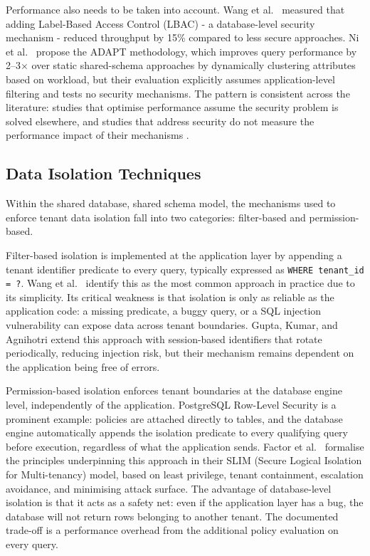 Performance also needs to be taken into account. Wang et al.\ \cite{wangStudyPerformanceEvaluation2008}
measured that adding Label-Based Access Control (LBAC) - a database-level
security mechanism - reduced throughput by 15\% compared to less secure approaches.
Ni et al.\ \cite{niAdaptiveDatabaseSchema2014} propose the ADAPT methodology, which improves query performance by 2--3$\times$ over static shared-schema approaches by dynamically
clustering attributes based on workload, but their evaluation explicitly assumes
application-level filtering and tests no security mechanisms. The pattern is
consistent across the literature: studies that optimise performance assume the
security problem is solved elsewhere, and studies that address security do not
measure the performance impact of their mechanisms \cite{karatasMultitenantArchitecturesCloud2017, battulaSystematicReviewMultitenant2024}.

\subsection*{Data Isolation Techniques}
Within the shared database, shared schema model, the mechanisms used to enforce
tenant data isolation fall into two categories: filter-based and
permission-based.

Filter-based isolation is implemented at the application layer by appending a
tenant identifier predicate to every query, typically expressed as
\texttt{WHERE tenant\_id = ?}. Wang et al.\ \cite{wangStudyPerformanceEvaluation2008} identify this as the
most common approach in practice due to its simplicity. Its critical weakness is
that isolation is only as reliable as the application code: a missing predicate,
a buggy query, or a SQL injection vulnerability can expose data across tenant
boundaries. Gupta, Kumar, and Agnihotri \cite{guptaDataIsolationMultitenant2016} extend this approach with session-based identifiers that rotate periodically, reducing injection risk, but their mechanism remains dependent on the application being free of errors.

Permission-based isolation enforces tenant boundaries at the database engine
level, independently of the application. PostgreSQL Row-Level Security is
a prominent example: policies are attached directly to tables, and the database
engine automatically appends the isolation predicate to every qualifying query
before execution, regardless of what the application sends. Factor et al.\
\cite{factorSecureLogicalIsolation2013} formalise the principles underpinning this approach in their SLIM (Secure Logical Isolation for Multi-tenancy) model, based on least privilege, tenant containment, escalation avoidance, and minimising attack surface. The advantage of database-level isolation is that it acts as a safety net: even if the application layer has a bug, the database will not return rows belonging to another tenant. The documented trade-off is a performance overhead from the additional policy evaluation on every query.

